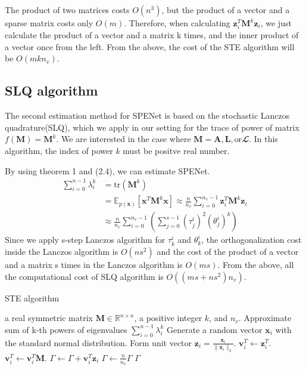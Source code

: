 \documentclass[senior,final,11pt]{iscs-thesis}
\begin{document}
The product of two matrices costs $O(n^3)$, but the product of a vector and a sparse matrix costs only $O(m)$. Therefore, when calculating $\mathbf{z}_i^{T}{\mathbf M}^k\mathbf{z}_i$, we just calculate the product of a vector and a matrix k times, and the inner product of a vector once from the left. From the above, the cost of the STE algorithm will be $O(mkn_v)$.


\subsection{SLQ algorithm}
The second estimation method for SPENet is based on the stochastic Lanczos quadrature(SLQ), which we apply in our setting for the trace of power of matrix $f({\mathbf M})={\mathbf M}^k$. We are interested in the case where ${\mathbf M} = {\mathbf A}, {\mathbf L}, \text{or} {\mathbfcal L}$. In this algorithm, the index of power $k$ must be positve real number.

By using theorem 1 and (2.4), we can estimate SPENet.
\begin{align}
    \sum_{i=0}^{n-1} \lambda_i^k &= \mathrm{tr}({\mathbf M}^k)  \nonumber\\
    &= \mathbb{E}_{p(\mathbf{x})}[\mathbf{x}^{T}{\mathbf M}^k \mathbf{x}] \approx \frac{n}{n_v}\sum_{i=0}^{n_v-1} \mathbf{z}_i^{T}{\mathbf M}^k\mathbf{z}_i \nonumber\\
    &\approx \frac{n}{n_v} \sum_{i=0}^{n_v-1}\left(\sum_{j=0}^{s-1} (\tau_j^i)^2 (\theta_j^i)^k \right)
\end{align}
Since we apply s-step Lanczos algorithm for $\tau_k^i$ and $\theta_k^i$, the orthogonalization cost inside the Lanczos algorithm is $O(ns^2)$ and the cost of the product of a vector and a matrix s times in the Lanczos algorithm is $O(ms)$. From the above, all the computational cost of SLQ algorithm is $O((ms+ns^2)n_v)$.


\begin{algorithm}
    \caption{STE algorithm}
    \begin{algorithmic}[1]
    \renewcommand{\algorithmicrequire}{\textbf{Input:}}
    \renewcommand{\algorithmicensure}{\textbf{Output:}}
    \REQUIRE a real symmetric matrix ${\mathbf M} \in {\mathbb R}^{n\times n}$, a positive integer $k$, and $n_v$.
    \ENSURE  Approximate sum of k-th powers of eigenvalues $\sum_{i=0}^{n-1} \lambda_i^k$
     \STATE Generate a random vector $\mathbf{x}_i$ with the standard normal distribution.
     \STATE Form unit vector $\mathbf{z}_i = \frac{\mathbf{x}_i}{\|\mathbf{x}_i\|_2}$.
     \STATE $\mathbf{v}_i^T \leftarrow \mathbf{z}_i^T $.
        \STATE $\mathbf{v}_i^T \leftarrow \mathbf{v}_i^T {\mathbf M}$.
        \ENDFOR
     \STATE $\Gamma \leftarrow \Gamma + \mathbf{v}_i^T \mathbf{z}_i$
     \ENDFOR
    \STATE $\Gamma \leftarrow \frac{n}{n_v}\Gamma$
    \RETURN $\Gamma$
    \end{algorithmic}
\end{algorithm}
\end{document}
